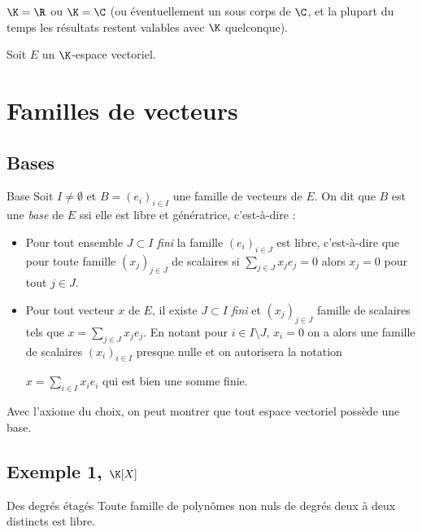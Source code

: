 $\K = \R$ ou $\K = \C$ (ou éventuellement un sous corps de $\C$, et la plupart du temps 
les résultats restent valables avec $\K$ quelconque). 

Soit $E$ un $\K$-espace vectoriel. 

\section{Familles de vecteurs}
\subsection{Bases }

\begin{definition}{Base}{}
    Soit $I \neq \emptyset$ et $B = (e_i)_{i \in I}$ une famille de vecteurs de $E$. 
    On dit que $B$ est une \emph{base} de $E$ ssi elle est libre et génératrice, c'est-à-dire : 
    \begin{itemize}
        \item Pour tout ensemble $J \subset I$ \emph{fini} la famille $(e_i)_{i \in J}$ est libre, c'est-à-dire que
            pour toute famille $(x_j)_{j \in J} $ de scalaires si $\sum_{j \in J} x_j e_j = 0$ alors $x_j = 0$ pour tout $j \in J$.
        \item Pour tout vecteur $x$ de $E$, il existe $J \subset I$ \emph{fini} et $(x_j)_{j \in J}$ famille 
        de scalaires tels que $x = \displaystyle \sum_{j \in J} x_j e_j$.
        En notant pour $i \in I \setminus J$, $x_i = 0$ on a alors une famille de scalaires 
        $(x_i)_{i \in I}$ presque nulle et on autorisera la notation 
        
        $x = \sum_{i \in I} x_i e_i$ qui 
        est bien une somme finie.
    \end{itemize}
\end{definition}

\begin{remarque}
    Avec l'axiome du choix, on peut montrer que tout espace vectoriel possède une base.
\end{remarque}

\subsection{Exemple 1, \texorpdfstring{$\K[X]$}{K[X]}}

\begin{theoreme}{Des degrés étagés}{}
    Toute famille de polynômes non nuls de degrés deux à deux distincts est libre.
\end{theoreme}

